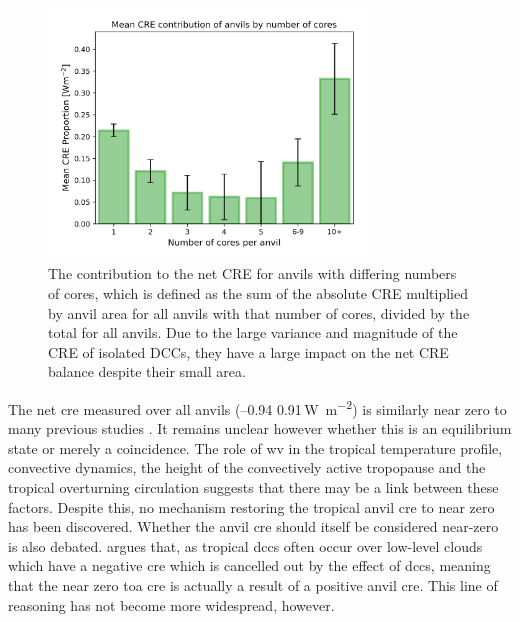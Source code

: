 \begin{figure}[tp]
    \centering
    \includegraphics[width=0.75\textwidth]{figures/chapter4_17.png}
    \caption[
    The contribution to the net CRE for anvils with differing numbers of cores
    ]{
    The contribution to the net CRE for anvils with differing numbers of cores, which is defined as the sum of the absolute CRE multiplied by anvil area for all anvils with that number of cores, divided by the total for all anvils. Due to the large variance and magnitude of the CRE of isolated DCCs, they have a large impact on the net CRE balance despite their small area. 
    }
    \label{fig:S_contribution_to_net_cre}
\end{figure}


The net \acrshort{cre} measured over all anvils (--0.94\,\textpm\,0.91\,\unit{W m^{-2}}) is similarly near zero to many previous studies \citep[][e.g.]{ramanathan_cloud-radiative_1989, hartmann_effect_1992, hartmann_tropical_2016}.
It remains unclear however whether this is an equilibrium state or merely a coincidence.
The role of \acrshort{wv} in the tropical temperature profile, convective dynamics, the height of the convectively active tropopause and the tropical overturning circulation suggests that there may be a link between these factors.
Despite this, no mechanism restoring the tropical anvil \acrshort{cre} to near zero has been discovered.
Whether the anvil \acrshort{cre} should itself be considered near-zero is also debated.
\citet{stephens_cloudsat_2018} argues that, as tropical \acrshort{dcc}s often occur over low-level clouds which have a negative \acrshort{cre} which is cancelled out by the effect of \acrshort{dcc}s, meaning that the near zero \acrshort{toa} \acrshort{cre} is actually a result of a positive anvil \acrshort{cre}.
This line of reasoning has not become more widespread, however.

